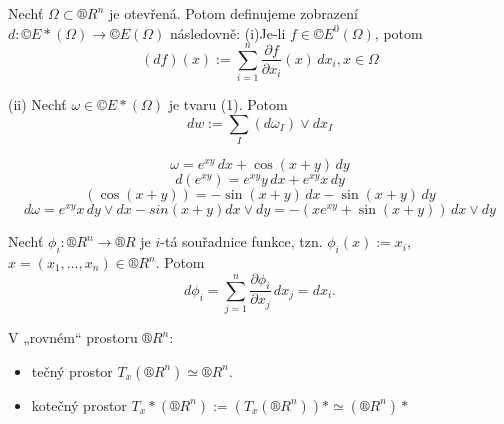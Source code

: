 \documentclass[12pt]{article}					%
\begin{document}
        \begin{definice}
            Nechť $\Omega \subset ®R^n$ je otevřená. Potom definujeme zobrazení $d: ©E*(\Omega) \rightarrow ©E(\Omega)$ následovně:
            (i)Je-li $f \in ©E^0(\Omega)$, potom
            $$ (df)(x) := \sum_{i=1}^{n} \frac{\partial f}{\partial x_i}(x)\,dx_i, x \in \Omega $$

            (ii) Nechť $\omega \in ©E*(\Omega)$ je tvaru (1). Potom
            $$ dw := \sum_{I} (d\omega_I)\lor dx_I $$

            \begin{prikladyin}
                $$ \omega = e^{xy}\,dx + \cos(x+y)\,dy $$
                $$ d(e^{xy}) = e^{xy}y\,dx + e^{xy}x\,dy $$ 
                $$ (\cos(x+y)) = -\sin(x+y)\,dx - \sin(x+y)\,dy $$ 
                $$ d\omega = e^{xy}x \,dy\lor dx - sin(x+y)dx \lor dy = -(xe^{xy} + \sin(x+y))\,dx\lor dy $$ 
            \end{prikladyin}
        \end{definice}

        \begin{poznamka}
            Nechť $\phi_i: ®R^n \rightarrow ®R$ je $i$-tá souřadnice funkce, tzn. $\phi_i(x) := x_i$, $x=(x_1, …, x_n)\in ®R^n$. Potom
            $$ d\phi_i = \sum_{j=1}^n \frac{\partial \phi_i}{\partial x_j}\, dx_j = dx_i. $$
        \end{poznamka}

        \begin{poznamka}
            V „rovném“ prostoru $®R^n$:
            \begin{itemize}
                \item tečný prostor $T_x(®R^n) \simeq ®R^n$.
                \item kotečný prostor $T_x*(®R^n) := (T_x(®R^n))* \simeq (®R^n)*$
            \end{itemize}
        \end{poznamka}
\end{document}
